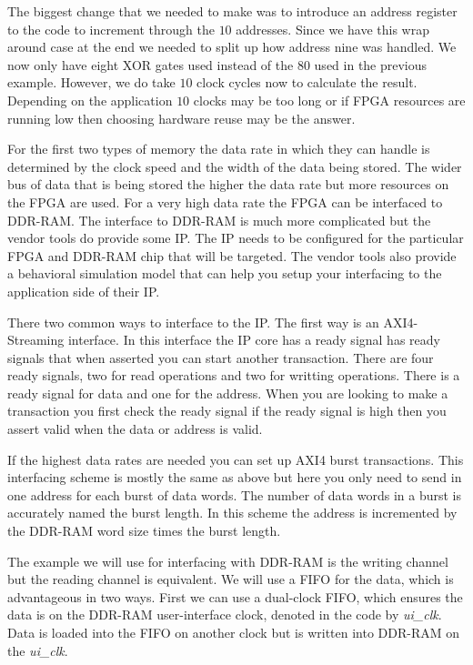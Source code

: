 The biggest change that we needed to make was to introduce an address register to the code to increment through the $10$ addresses. Since we have this wrap around case at the end we needed to split up how address nine was handled. We now only have eight \ac{XOR} gates used instead of the $80$ used in the previous example. However, we do take $10$ clock cycles now to calculate the result. Depending on the application $10$ clocks may be too long or if \ac{FPGA} resources are running low then choosing hardware reuse may be the answer. 
	
For the first two types of memory the data rate in which they can handle is determined by the clock speed and the width of the data being stored. The wider bus of data that is being stored the higher the data rate but more resources on the \ac{FPGA} are used. For a very high data rate the \ac{FPGA} can be interfaced to \ac{DDR}-\ac{RAM}. The interface to \ac{DDR}-\ac{RAM} is much more complicated but the vendor tools do provide some \ac{IP}. The \ac{IP} needs to be configured for the particular \ac{FPGA} and \ac{DDR}-\ac{RAM} chip that will be targeted. The vendor tools also provide a behavioral simulation model that can help you setup your interfacing to the application side of their \ac{IP}. 

There two common ways to interface to the \ac{IP}. The first way is an \ac{AXI4}-Streaming interface. In this interface the \ac{IP} core has a ready signal has ready signals that when asserted you can start another transaction. There are four ready signals, two for read operations and two for writting operations. There is a ready signal for data and one for the address. When you are looking to make a transaction you first check the ready signal if the ready signal is high then you assert valid when the data or address is valid. 

If the highest data rates are needed you can set up \ac{AXI4} burst transactions. This interfacing scheme is mostly the same as above but here you only need to send in one address for each burst of data words. The number of data words in a burst is accurately named the burst length. In this scheme the address is incremented by the \ac{DDR}-\ac{RAM} word size times the burst length.  

The example we will use for interfacing with \ac{DDR}-\ac{RAM} is the writing channel but the reading channel is equivalent. We will use a \ac{FIFO} for the data, which is advantageous in two ways. First we can use a dual-clock \ac{FIFO}, which ensures the data is on the \ac{DDR}-\ac{RAM} user-interface clock, denoted in the code by \emph{ui\_clk}. Data is loaded into the \ac{FIFO} on another clock but is written into \ac{DDR}-\ac{RAM} on the \emph{ui\_clk}. 

